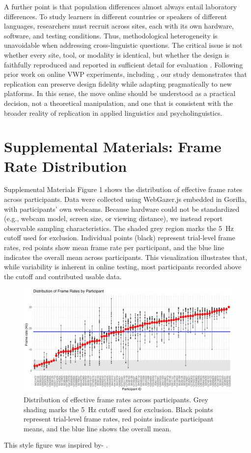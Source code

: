 \documentclass[sn-apa]{sn-jnl} %
\begin{document}
A further point is that population differences almost always entail laboratory
differences. To study learners in different countries or speakers of different
languages, researchers must recruit across sites, each with its own hardware,
software, and testing conditions. Thus, methodological heterogeneity is
unavoidable when addressing cross-linguistic questions. The critical issue is
not whether every site, tool, or modality is identical, but whether the design
is faithfully reproduced and reported in sufficient detail for evaluation
\parencite{mcmanus2024}. Following prior work on online VWP experiments,
including \textcite{AOW}, our study demonstrates that replication can
preserve design fidelity while adapting pragmatically to new platforms. In this
sense, the move online should be understood as a practical decision, not a theoretical manipulation, and one that is consistent with the broader reality of replication in applied linguistics and psycholinguistics.


\section{Supplemental Materials: Frame Rate Distribution}

\noindent
Supplemental Materials Figure 1 shows the distribution of effective frame rates across participants. Data were collected using 
WebGazer.js embedded in Gorilla, with participants’ own webcams. Because hardware could not be standardized (e.g., webcam model, screen size, or viewing 
distance), we instead report observable sampling characteristics. The shaded grey region marks the 5~Hz cutoff used for exclusion. Individual points (black) 
represent trial-level frame rates, red points show mean frame rate per participant, and the blue line indicates the overall mean across participants. This visualization illustrates that, while variability is inherent in online testing, most participants recorded above the cutoff and contributed usable data.

\begin{figure}[h]
    \centering
    \includegraphics[width=\textwidth]{viz/fr.png}
    \caption{Distribution of effective frame rates across participants. Grey 
    shading marks the 5~Hz cutoff used for exclusion. Black points represent 
    trial-level frame rates, red points indicate participant means, and the 
    blue line shows the overall mean.}
    \label{fig:frame_rate}
\end{figure}

This style figure was inspired by-  \textcite{AOW}. 
\end{document}
